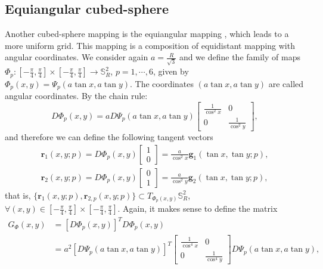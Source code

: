 \subsection{Equiangular cubed-sphere}
\label{equiangular-cs}
Another cubed-sphere mapping is the equiangular mapping \citep{ronchi:1996},
which leads to a more uniform grid. This mapping is a composition of equidistant mapping with
angular coordinates.
We consider again $a=\frac{R}{\sqrt{3}}$
and we define the family of maps
$\Phi_{p}: [-\frac{\pi}{4},\frac{\pi}{4}] 
\times [-\frac{\pi}{4},\frac{\pi}{4}] 
\to \mathbb{S}^2_R$, $p=1, \cdots, 6$,
given by $\Phi_{p}(x,y) = \Psi_{p}(a\tan{x}, a\tan{y})$.
The coordinates $(a\tan{x}, a\tan{y})$ are called angular coordinates.
By the chain rule:
\begin{equation}
	D\Phi_{p}(x,y) = a
	D\Psi_{p}(a\tan{x}, a\tan{y})
	\begin{bmatrix}
		\frac{1}{\cos^2 x} & 0 \\ 
		0 & \frac{1}{\cos^2 y} 
	\end{bmatrix},
\end{equation}
and therefore we can define the following tangent vectors
\begin{align}
	\boldsymbol{r}_{1}(x,y;p) = D\Phi_{p}(x,y)
	\begin{bmatrix}
		 1 \\
		 0
	\end{bmatrix}
	= \frac{a}{\cos^2 x}
	\boldsymbol{g}_{1}(\tan{x}, \tan{y}; p)
	,\\
	\boldsymbol{r}_{2}(x, y ;p) = D\Phi_{p}(x,y)
	\begin{bmatrix}
		 0 \\
		 1
	\end{bmatrix}
	= \frac{a}{\cos^2 y}
	\boldsymbol{g}_{2}(\tan{x}, \tan{y}; p),
\end{align}
that is, $\{\boldsymbol{r}_{1}(x,y;p),\boldsymbol{r}_{2,p}(x,y;p)\} \subset T_{\Phi_p(x,y)}
\mathbb{S}_{R}^2$, $\forall (x,y) \in 
[-\frac{\pi}{4},\frac{\pi}{4}] 
\times [-\frac{\pi}{4},\frac{\pi}{4}]$.
Again, it makes sense to define the matrix 
\begin{align}
	G_{\Phi}(x,y) &= [D\Phi_{p}(x,y)]^TD\Phi_{p}(x,y) \\
	&= a^2
	[D\Psi_{p}(a\tan{x},a\tan{y})]^T
	\begin{bmatrix}
		\frac{1}{\cos^4 x} & 0 \\ 
		0 & \frac{1}{\cos^4 y} 
	\end{bmatrix}
	D\Psi_{p}(a\tan{x}, a\tan{y}),
\end{align}
